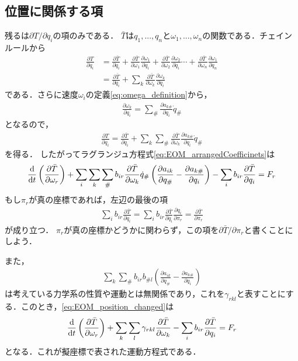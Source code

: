 \documentclass[a4j,10pt]{jsarticle}
\newcommand{\bbn}[2]{\frac{{\rm {\rm d}} #1}{{\rm {\rm d}} #2}}
\newcommand{\henbbn}[2]{\frac{\partial #1}{\partial #2}}
\begin{document}
\subsection*{位置に関係する項}
残るは$\partial T/\partial q_i$の項のみである．
$\bar{T}$は$q_1,...,q_n$と$\omega_1,...,\omega_n$の関数である．チェインルールから
\begin{align*}
    \henbbn{T}{q_i} &= \henbbn{\bar{T}}{q_i}+\henbbn{\bar{T}}{\omega_1}\henbbn{\omega_1}{q_i} + \henbbn{\bar{T}}{\omega_2}\henbbn{\omega_2}{q_i} \cdots +\henbbn{\bar{T}}{\omega_n}\henbbn{\omega_1}{q_n}\\
    &= \henbbn{\bar{T}}{q_i} + \sum_k \henbbn{\bar{T}}{\omega_k}\henbbn{\omega_k}{q_i}
\end{align*}
である．さらに速度$\omega_i$の定義\eqref{eq:omega_definition}から，
\begin{align*}
    \henbbn{\omega_k}{q_i}=
    \sum_\#\henbbn{a_{k\#}}{q_i}\dot{q}_\#
\end{align*}
となるので，
\begin{align*}
    \henbbn{T}{q_i} =\henbbn{\bar{T}}{q_i} + \sum_k \sum_\# \henbbn{\bar{T}}{\omega_k}\henbbn{a_{k\#}}{q_i}\dot{q}_\#
\end{align*}
を得る．
したがってラグランジュ方程式\eqref{eq:EOM_arrangedCoefficinets}は
\begin{align}
    \bbn{}{t}\left(\henbbn{\bar{T}}{\omega_r}\right)+\sum_i\sum_k\sum_\# b_{ir}\henbbn{\bar{T}}{\omega_k}\dot{q}_\# \left(\henbbn{a_{ik}}{q_\#} - \henbbn{a_{k\#}}{q_i}\right)-\sum_i b_{ir}\henbbn{\bar{T}}{q_i}=F_r
    \label{eq:EOM_position_changed}
\end{align}
もし$\pi_r$が真の座標であれば，左辺の最後の項
\begin{align*}
    \sum_i b_{ir}\henbbn{\bar{T}}{q_i} = \sum_i b_{ir}\henbbn{\bar{T}}{q_i}\henbbn{q_i}{\pi_r} = \henbbn{\bar{T}}{\pi_r}
\end{align*}
が成り立つ．
$\pi_r$が真の座標かどうかに関わらず，この項を$\partial{\bar{T}}/\partial{\pi_r}$と書くことにしよう．

また，
\begin{align}
    \sum_k\sum_\# b_{ir}b_{\# l} \left(\henbbn{a_{ik}}{q_\#} - \henbbn{a_{k\#}}{q_i}\right)
\end{align}
は考えている力学系の性質や運動とは無関係であり，これを$\gamma_{rkl}$と表すことにする．このとき，\eqref{eq:EOM_position_changed}は
\begin{align}
    \bbn{}{t}\left(\henbbn{\bar{T}}{\omega_r}\right)+\sum_k\sum_l \gamma_{rkl}\henbbn{\bar{T}}{\omega_k} - \sum_i b_{ir}\henbbn{\bar{T}}{q_i}=F_r
    \label{eq:EOM_quasiCoordinate}
\end{align}
となる．これが擬座標で表された運動方程式である．
\end{document}
